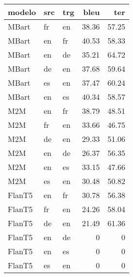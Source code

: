 \begin{tabular}{lllrr}
\hline
 modelo   & src   & trg   &   bleu &   ter \\
\hline
 MBart    & fr    & en    &  38.36 & 57.25 \\
 MBart    & en    & fr    &  40.53 & 58.33 \\
 MBart    & en    & de    &  35.21 & 64.72 \\
 MBart    & de    & en    &  37.68 & 59.64 \\
 MBart    & es    & en    &  37.47 & 60.24 \\
 MBart    & en    & es    &  40.34 & 58.57 \\
 M2M      & en    & fr    &  38.79 & 48.51 \\
 M2M      & fr    & en    &  33.66 & 46.75 \\
 M2M      & de    & en    &  29.33 & 51.06 \\
 M2M      & en    & de    &  26.37 & 56.35 \\
 M2M      & en    & es    &  33.15 & 47.66 \\
 M2M      & es    & en    &  30.48 & 50.82 \\
 FlanT5   & en    & fr    &  30.78 & 56.38 \\
 FlanT5   & fr    & en    &  24.26 & 58.04 \\
 FlanT5   & de    & en    &  21.49 & 61.36 \\
 FlanT5   & en    & de    &   0    &  0    \\
 FlanT5   & en    & es    &   0    &  0    \\
 FlanT5   & es    & en    &   0    &  0    \\
\hline
\end{tabular}